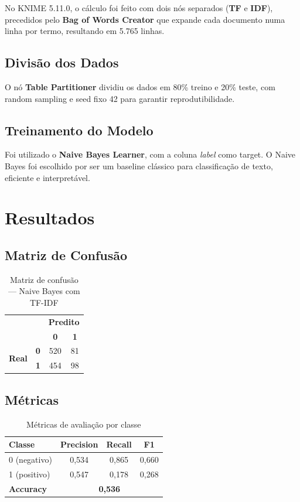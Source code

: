 \documentclass[10pt,twocolumn]{article}
\begin{document}
No KNIME 5.11.0, o cálculo foi feito com dois nós separados (\textbf{TF} e \textbf{IDF}), precedidos pelo \textbf{Bag of Words Creator} que expande cada documento numa linha por termo, resultando em 5.765 linhas.

\subsection{Divisão dos Dados}

O nó \textbf{Table Partitioner} dividiu os dados em 80\% treino e 20\% teste, com random sampling e seed fixo 42 para garantir reprodutibilidade.

\subsection{Treinamento do Modelo}

Foi utilizado o \textbf{Naive Bayes Learner}, com a coluna \textit{label} como target. O Naive Bayes foi escolhido por ser um baseline clássico para classificação de texto, eficiente e interpretável.

\section{Resultados}

\subsection{Matriz de Confusão}

\begin{table}[H]
\centering
\caption{Matriz de confusão --- Naive Bayes com TF-IDF}
\begin{tabular}{cc|cc}
\toprule
& & \multicolumn{2}{c}{\textbf{Predito}} \\
& & \textbf{0} & \textbf{1} \\
\midrule
\multirow{2}{*}{\textbf{Real}} & \textbf{0} & 520 & 81 \\
& \textbf{1} & 454 & 98 \\
\bottomrule
\end{tabular}
\end{table}

\subsection{Métricas}

\begin{table}[H]
\centering
\caption{Métricas de avaliação por classe}
\begin{tabular}{lccc}
\toprule
\textbf{Classe} & \textbf{Precision} & \textbf{Recall} & \textbf{F1} \\
\midrule
0 (negativo) & 0,534 & 0,865 & 0,660 \\
1 (positivo) & 0,547 & 0,178 & 0,268 \\
\midrule
\textbf{Accuracy} & \multicolumn{3}{c}{\textbf{0,536}} \\
\bottomrule
\end{tabular}
\end{table}
\end{document}
